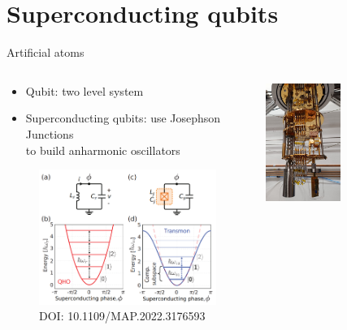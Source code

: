\documentclass[aspectratio=169,10pt]{beamer}
\begin{document}
\section{Superconducting qubits}

\begin{frame}{Artificial atoms}
  \begin{columns}
    \begin{column}{0.6\textwidth}
      \centering
      \begin{itemize}
        \item Qubit: two level system
        \hspace{10 mm}
        \item Superconducting qubits: use Josephson Junctions\\ to build anharmonic oscillators
      \end{itemize}
      \begin{figure}
        \centering
        \includegraphics[height=0.5\textheight]{figures/Transmon.png}\\
        {\tiny DOI: 10.1109/MAP.2022.3176593}      
      \end{figure}
    \end{column}
    \begin{column}{0.6\textwidth}
      \centering
      \includegraphics[width=0.5\textwidth]{figures/cryostat.png}

\end{column}
\end{columns}
\end{frame}
\end{document}
